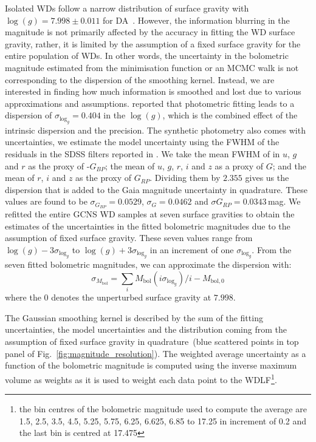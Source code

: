 \documentclass[fleqn,usenatbib]{mnras}
\begin{document}
Isolated WDs follow a narrow distribution of surface gravity with
$\log(g)=7.998 \pm 0.011$ for DA~\citep{2021MNRAS.507.4646K}. However, the
information blurring in the magnitude is not primarily affected by the accuracy
in fitting the WD surface gravity, rather, it is limited by the assumption of a
fixed surface gravity for the entire population of WDs. In other words, the
uncertainty in the bolometric magnitude estimated from the minimisation
function or an MCMC walk is not corresponding to the dispersion of the
smoothing kernel. Instead, we are interested in finding how much information
is smoothed and lost due to various approximations and assumptions.
\citet{2014ApJ...796..128G} reported that photometric fitting leads to a
dispersion of $\sigma_{\mathrm{log}_{g}} = 0.404$ in the $\log(g)$, which is
the combined effect of the intrinsic dispersion and the precision. The
synthetic photometry also comes with uncertainties, we estimate the model
uncertainty using the FWHM of the residuals in the SDSS filters reported in
\citet{2006AJ....132.1221H}. We take the mean FWHM of in $u$, $g$ and $r$ as
the proxy of -$G_{BP}$; the mean of $u$, $g$, $r$, $i$ and $z$ as a proxy of
$G$; and the mean of $r$, $i$ and $z$ as the proxy of $G_{RP}$. Dividing them
by $2.355$ gives us the dispersion that is added to the Gaia magnitude
uncertainty in quadrature. These values are found to be
$\sigma_{G_{BP}}=0.0529$, $\sigma_{G}=0.0462$ and $\sigma{G_{RP}}=0.0343$\,mag.
We refitted the entire GCNS WD samples at seven surface gravities to obtain
the estimates of the uncertainties in the fitted bolometric magnitudes due to
the assumption of fixed surface gravity. These seven values range from
$\log(g) - 3\sigma_{\mathrm{log}_{g}}$ to $\log(g) + 3\sigma_{\mathrm{log}_{g}}$
in an increment of one $\sigma_{\mathrm{log}_{g}}$. From the seven fitted
bolometric magnitudes, we can approximate the dispersion with:
\begin{equation}
  \sigma_{M_{\mathrm{bol}}} = \sum_{i} M_{\mathrm{bol}}(i\sigma_{\mathrm{log}_{g}}) / i - M_{\mathrm{bol}, 0}
\end{equation}
where the $0$ denotes the unperturbed surface gravity at $7.998$.

The Gaussian smoothing kernel is described by the sum of the fitting
uncertainties, the model uncertainties and the distribution coming from the
assumption of fixed surface gravity in quadrature~(blue scattered points in top
panel of Fig.~\ref{fig:magnitude_resolution}). The weighted average uncertainty
as a function of the bolometric magnitude is computed using the inverse maximum
volume as weights as it is used to weight each data point to the WDLF\footnote{
the bin centres of the bolometric magnitude used to compute the average are
1.5,  2.5,  3.5,  4.5,  5.25,  5.75,  6.25,  6.625, 6.85 to 17.25 in increment
of 0.2 and the last bin is centred at 17.475}.
\end{document}
